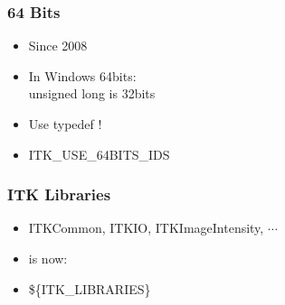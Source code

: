 

\begin{frame}
\frametitle{64 Bits}
\Huge
\begin{itemize}
\item Since 2008
\pause
\item In Windows 64bits:\\unsigned long is 32bits
\pause
\item Use typedef !
\pause
\item ITK\_USE\_64BITS\_IDS
\end{itemize}
\end{frame}


\begin{frame}
\frametitle{ITK Libraries}
\Huge
\begin{itemize}
\item ITKCommon, ITKIO, ITKImageIntensity, $\cdots$
\pause
\item is now:
\pause
\item \$\{ITK\_LIBRARIES\}
\end{itemize}
\end{frame}


